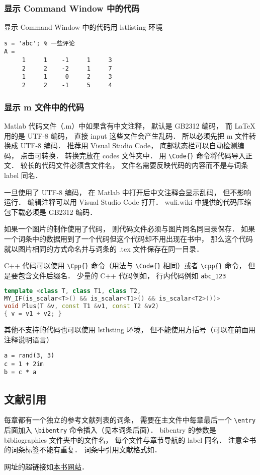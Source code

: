 \subsubsection{显示  Command Window 中的代码}
显示  Command Window 中的代码用 lstlisting 环境
\begin{lstlisting}[language=MatlabCom]
s = 'abc'; % 一些评论
A =
     1     1    -1     1     3
     2     2    -2     1     7
     1     1     0     2     3
     2     2    -1     5     4
\end{lstlisting}

\subsubsection{显示 m 文件中的代码}

Matlab 代码文件（.m）中如果含有中文注释， 默认是 GB2312 编码， 而 LaTeX 用的是 UTF-8 编码， 直接 input 这些文件会产生乱码． 所以必须先把 m 文件转换成 UTF-8 编码． 推荐用 Visual Studio Code， 底部状态栏可以自动检测编码， 点击可转换． 转换完放在 codes 文件夹中． 用 \lstinline|\Code{}| 命令将代码导入正文． 较长的代码文件必须含文件名， 文件名需要反映代码的内容而不是与词条 label 同名．

一旦使用了 UTF-8 编码， 在 Matlab 中打开后中文注释会显示乱码， 但不影响运行． 编辑注释可以用 Visual Studio Code 打开． wuli.wiki 中提供的代码压缩包下载必须是 GB2312 编码．

如果一个图片的制作使用了代码， 则代码文件必须与图片同名同目录保存． 如果一个词条中的数据用到了一个代码但这个代码却不用出现在书中， 那么这个代码就以图片相同的方式命名并与词条的 .tex 文件保存在同一目录． 


C++ 代码可以使用 \lstinline|\Cpp{}| 命令（用法与 \lstinline|\Code{}| 相同）或者 \lstinline|\cpp{}| 命令， 但是要包含文件后缀名． 少量的 C++ 代码例如， 行内代码例如 \lstinline|abc_123|
\begin{lstlisting}[language=cpp]
template <class T, class T1, class T2,
MY_IF(is_scalar<T>() && is_scalar<T1>() && is_scalar<T2>())>
void Plus(T &v, const T1 &v1, const T2 &v2)
{ v = v1 + v2; }
\end{lstlisting}

其他不支持的代码也可以使用 lstlisting 环境， 但不能使用方括号（可以在前面用注释说明语言）
\begin{lstlisting}
a = rand(3, 3)
c = 1 + 2im
b = c * a
\end{lstlisting}


\subsection{文献引用}
每章都有一个独立的参考文献列表的词条， 需要在主文件中每章最后一个 \lstinline|\entry| 后面加入 \lstinline|\bibentry| 命令插入（见本词条后面）． bibentry 的参数是 bibliographies 文件夹中的文件名， 每个文件与章节导航的 label 同名． 注意全书的词条标签不能有重复． 词条中引用文献格式如\cite{PhysWiki}\cite{PhysWikiEng}．

网址的超链接如\href{http://wuli.wiki}{本书网站}．

